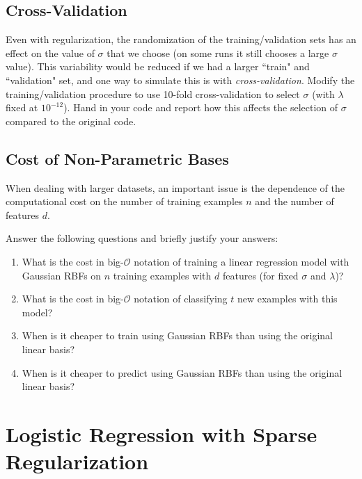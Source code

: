\documentclass{article}
\def\blu#1{{\color{blu}#1}}
\def\enum#1{\begin{enumerate}#1\end{enumerate}}
\begin{document}
\pagebreak


\subsection{Cross-Validation}

Even with regularization, the randomization of the training/validation sets has an effect on the value of $\sigma$ that we choose (on some runs it still chooses a large $\sigma$ value).
This variability would be reduced if we had a larger ``train" and ``validation" set, and one way to simulate this is with \emph{cross-validation}. \blu{Modify the training/validation procedure to use 10-fold cross-validation to select $\sigma$ (with $\lambda$ fixed at $10^{-12}$). Hand in your code and report how this affects the selection of $\sigma$ compared to the original code.}


\pagebreak

\subsection{Cost of Non-Parametric Bases}

When dealing with larger datasets, an important issue is the dependence of the computational cost on the number of training examples $n$ and the number of features $d$.

\blu{Answer the following questions and briefly justify your answers:
\enum{
\item What is the cost in big-$\mathcal{O}$ notation of training a linear regression model with Gaussian RBFs on $n$ training examples with $d$ features (for fixed $\sigma$ and $\lambda$)?
\item What is the cost in big-$\mathcal{O}$ notation of classifying $t$ new examples with this model?
\item When is it cheaper to train using Gaussian RBFs than using the original linear basis?
\item When is it cheaper to predict using Gaussian RBFs than using the original linear basis?
}}

\pagebreak

\section{Logistic Regression with Sparse Regularization }
\end{document}
